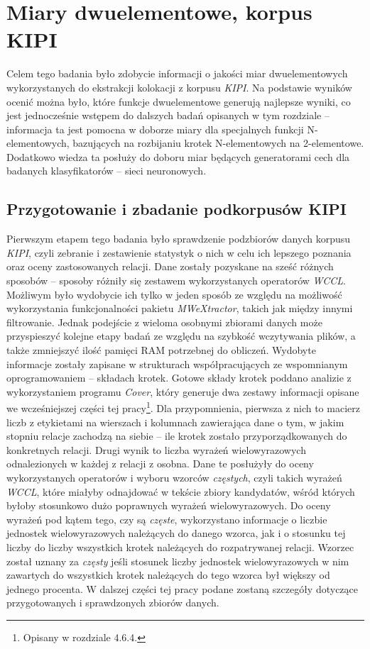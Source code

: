 \section{Miary dwuelementowe, korpus KIPI}
Celem tego badania było zdobycie informacji o jakości miar dwuelementowych wykorzystanych do ekstrakcji kolokacji z korpusu \emph{KIPI}.
Na podstawie wyników ocenić można było, które funkcje dwuelementowe generują najlepsze wyniki, co jest jednocześnie wstępem do dalszych badań opisanych w tym rozdziale -- informacja ta jest pomocna w doborze miary dla specjalnych funkcji N-elementowych, bazujących na rozbijaniu krotek N-elementowych na 2-elementowe.
Dodatkowo wiedza ta posłuży do doboru miar będących generatorami cech dla badanych klasyfikatorów -- sieci neuronowych.

\subsection{Przygotowanie i zbadanie podkorpusów KIPI}
Pierwszym etapem tego badania było sprawdzenie podzbiorów danych korpusu \emph{KIPI}, czyli zebranie i zestawienie statystyk o nich w celu ich lepszego poznania oraz oceny zastosowanych relacji.
Dane zostały pozyskane na sześć różnych sposobów -- sposoby różniły się zestawem wykorzystanych operatorów \emph{WCCL}.
Możliwym było wydobycie ich tylko w jeden sposób ze względu na możliwość wykorzystania funkcjonalności pakietu \emph{MWeXtractor}, takich jak między innymi filtrowanie.
Jednak podejście z wieloma osobnymi zbiorami danych może przyspieszyć kolejne etapy badań ze względu na szybkość wczytywania plików, a także zmniejszyć ilość pamięci RAM potrzebnej do obliczeń.
Wydobyte informacje zostały zapisane w strukturach współpracujących ze wspomnianym oprogramowaniem -- składach krotek.
Gotowe składy krotek poddano analizie z wykorzystaniem programu \emph{Cover}, który generuje dwa zestawy informacji opisane we wcześniejszej części tej pracy\footnote{Opisany w rozdziale 4.6.4.}.
Dla przypomnienia, pierwsza z nich to macierz liczb z etykietami na wierszach i kolumnach zawierająca dane o tym, w jakim stopniu relacje zachodzą na siebie -- ile krotek zostało przyporządkowanych do konkretnych relacji.
Drugi wynik to liczba wyrażeń wielowyrazowych odnalezionych w każdej z relacji z osobna.
Dane te posłużyły do oceny wykorzystanych operatorów i wyboru wzorców \emph{częstych}, czyli takich wyrażeń \emph{WCCL}, które miałyby odnajdować w tekście zbiory kandydatów, wśród których byłoby stosunkowo dużo poprawnych wyrażeń wielowyrazowych.
Do oceny wyrażeń pod kątem tego, czy są \emph{częste}, wykorzystano informacje o liczbie jednostek wielowyrazowych należących do danego wzorca, jak i o stosunku tej liczby do liczby wszystkich krotek należących do rozpatrywanej relacji.
Wzorzec został uznany za \emph{częsty} jeśli stosunek liczby jednostek wielowyrazowych w nim zawartych do wszystkich krotek należących do tego wzorca był większy od jednego procenta.
W dalszej części tej pracy podane zostaną szczegóły dotyczące przygotowanych i sprawdzonych zbiorów danych.


